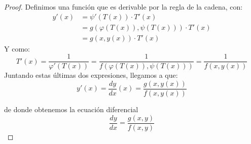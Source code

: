\begin{teo}
\begin{proof}
        Definimos una función
        que es derivable por la regla de la cadena, con:
        \begin{align*}
            y'(x) &= \psi'(T(x))\cdot T'(x) \\
                  &= g(\varphi(T(x)), \psi(T(x)))\cdot T'(x) \\
                  &= g(x, y(x))\cdot T'(x)
        \end{align*}
        Y como:
        \begin{equation*}
            T'(x) = \dfrac{1}{\varphi'(T(x))} = \dfrac{1}{f(\varphi(T(x)), \psi(T(x)))} = \dfrac{1}{f(x,y(x))}
        \end{equation*}
        Juntando estas últimas dos expresiones, llegamos a que:
        \begin{equation*}
            y'(x) = \dfrac{dy}{dx}(x) = \dfrac{g(x,y(x))}{f(x,y(x))}
        \end{equation*}

        de donde obtenemos la ecuación diferencial
        \begin{equation*}
            \dfrac{dy}{dx} = \dfrac{g(x,y)}{f(x,y)}
        \end{equation*}
    \end{proof}
\end{teo}

